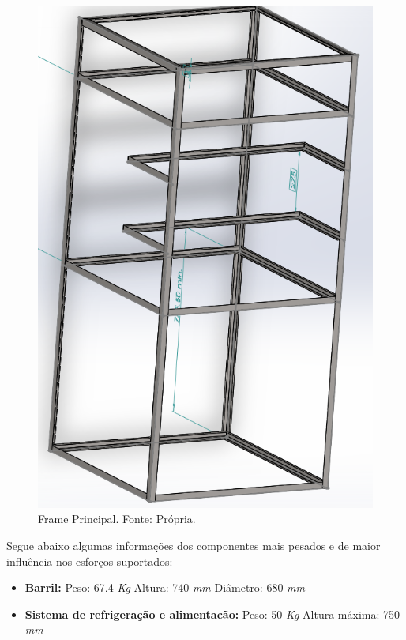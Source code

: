   \begin{figure}[H]
    \centering
    \includegraphics[scale= 0.4]{figuras/estrutura/frame-principal.png}
    \caption{Frame Principal. Fonte: Própria.}
    \label{modelagem}
  \end{figure}

  Segue abaixo algumas informações dos componentes mais pesados e de maior influência nos esforços suportados:

  \begin{itemize}
    \item \textbf{Barril:}
    \subitem  Peso: 67.4 \textit{Kg}
    \subitem  Altura: 740 \textit{mm}    
    \subitem  Diâmetro: 680 \textit{mm}
    
    \item \textbf{Sistema de refrigeração e alimentacão:}
    \subitem Peso: 50 \textit{Kg}
    \subitem Altura máxima: 750 \textit{mm}
  \end{itemize}

